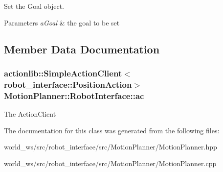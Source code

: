 Set the Goal object. 


\begin{DoxyParams}{Parameters}
{\em a\+Goal} & the goal to be set \\
\hline
\end{DoxyParams}


\subsection{Member Data Documentation}
\subsubsection[{\texorpdfstring{ac}{ac}}]{\setlength{\rightskip}{0pt plus 5cm}actionlib\+::\+Simple\+Action\+Client$<$robot\+\_\+interface\+::\+Position\+Action$>$ Motion\+Planner\+::\+Robot\+Interface\+::ac}\hypertarget{classMotionPlanner_1_1RobotInterface_a30681da8a4fdb4420b625361b71b4f72}{}\label{classMotionPlanner_1_1RobotInterface_a30681da8a4fdb4420b625361b71b4f72}
The Action\+Client 

The documentation for this class was generated from the following files\+:\begin{DoxyCompactItemize}
\item 
world\+\_\+ws/src/robot\+\_\+interface/src/\+Motion\+Planner/Motion\+Planner.\+hpp\item 
world\+\_\+ws/src/robot\+\_\+interface/src/\+Motion\+Planner/Motion\+Planner.\+cpp\end{DoxyCompactItemize}
